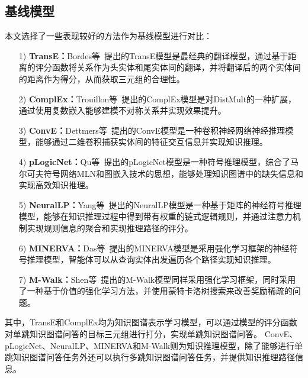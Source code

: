 \documentclass[algorithmlist, AutoFakeBold, AutoFakeSlant, figurelist, tablelist, nomlist, engineering]{seuthesix}
\begin{document}
\subsection{基线模型}
本文选择了一些表现较好的方法作为基线模型进行对比：
\begin{itemize}
  \item [1)]\textbf{TransE：}Bordes等~\cite{bordes2013translating}提出的TransE模型是最经典的翻译模型，通过基于距离的评分函数将关系作为头实体和尾实体间的翻译，并将翻译后的两个实体间的距离作为得分，从而获取三元组的合理性。
  \item [2)]\textbf{ComplEx：}Trouillon等~\cite{trouillon2016complex}提出的ComplEx模型是对DistMult的一种扩展，通过使用复数嵌入能够建模不对称关系并实现效果提升。
  \item [3)]\textbf{ConvE：}Dettmers等~\cite{dettmers2018convolutional}提出的ConvE模型是一种卷积神经网络神经推理模型，能够通过二维卷积捕获实体间的特征交互信息并实现知识推理。
  \item [4)]\textbf{pLogicNet：}Qu等~\cite{qu2019probabilistic}提出的pLogicNet模型是一种符号推理模型，综合了马尔可夫符号网络MLN和图嵌入技术的思想，能够处理知识图谱中的缺失信息和实现高效知识推理。
  \item [5)]\textbf{NeuralLP：}Yang等~\cite{yang2017differentiable}提出的NeuralLP模型是一种基于矩阵的神经符号推理模型，能够在知识推理过程中得到带有权重的链式逻辑规则，并通过注意力机制实现规则信息的聚合和实现推理路径的评分。
  \item [6)]\textbf{MINERVA：}Das等~\cite{das2018go}提出的MINERVA模型是采用强化学习框架的神经符号推理模型，智能体可以从查询实体出发遍历各个路径实现知识推理。
  \item [7)]\textbf{M-Walk：}Shen等~\cite{shen2018m}提出的M-Walk模型同样采用强化学习框架，同时采用了一种基于价值的强化学习方法，并使用蒙特卡洛树搜索来改善奖励稀疏的问题。
\end{itemize}
其中，TransE和ComplEx均为知识图谱表示学习模型，可以通过模型的评分函数对单跳知识图谱问答的目标三元组进行打分，实现单跳知识图谱问答。
ConvE、pLogicNet、NeuralLP、MINERVA和M-Walk则为知识推理模型，除了能够进行单跳知识图谱问答任务外还可以执行多跳知识图谱问答任务，并提供知识推理路径信息。
\end{document}

